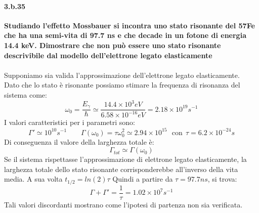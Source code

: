 \documentclass[twoside]{article}
\begin{document}
\paragraph{3.b.35}\textbf{Studiando l'effetto Mossbauer si incontra uno stato risonante del 57Fe che ha una semi-vita di 97.7 ns e che decade in un fotone di energia 14.4 keV. Dimostrare che non può essere uno stato risonante descrivibile dal modello dell'elettrone legato elasticamente}\\\\
Supponiamo sia valida l'approssimazione dell'elettrone legato elasticamente.\\
Dato che lo stato è risonante possiamo stimare la frequenza di risonanza del sistema come:
\begin{equation*}
	\omega_0=\frac{E_\gamma}{\hbar}\simeq\frac{14.4\times 10^3eV}{6.58\times 10^{-16}eV}=2.18 \times 10^{19} s^{-1}
\end{equation*}
I valori caratteristici per i parametri sono:
\begin{equation}
	\Gamma'\simeq 10^{10} s^{-1} \qquad \Gamma(\omega_0)=\tau\omega_0^2\simeq 2.94 \times 10^{15} \ \ \ \text{con} \ \ \tau=6.2 \times 10^{-24} s
\end{equation}
Di conseguenza il valore della larghezza totale è:
\[ \Gamma_{tot} \simeq \Gamma(\omega_0)
\]
Se il sistema rispettasse l'approssimazione di elettrone legato elasticamente, la larghezza totale dello stato risonante corrisponderebbe all'inverso della vita media. A sua volta $t_{1/2}=ln(2)\tau$
Quindi a partire da $\tau=97.7 ns$, si trova:
\begin{equation}
	\Gamma+\Gamma'=\frac{1}{\tau}=1.02 \times 10^{7} s^{-1}
\end{equation}
Tali valori discordanti mostrano come l'ipotesi di partenza non sia verificata.
\end{document}
